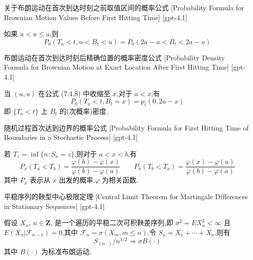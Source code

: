 \documentclass[UTF8]{ctexart}
\begin{document}
    
    
    \begin{thm}
        {关于布朗运动在首次到达时刻之前取值区间的概率公式}
        [Probability Formula for Brownian Motion Values Before First Hitting Time]
        [gpt-4.1]
        
如果 $u < 
u \leq a$,则
\[
P_{0}( T_{a} < t, u < B_{t} < 
u ) = P_{0}( 2a - 
u < B_{t} < 2a - u )
\]

    \end{thm}
    
    
    
    \begin{thm}
        {布朗运动在首次到达时刻后精确位置的概率密度公式}
        [Probability Density Formula for Brownian Motion at Exact Location After First Hitting Time]
        [gpt-4.1]
        
当 $(u, 
u)$ 在公式 (7.4.8) 中收缩至 $x$,对于 $a < x$,有
\[
P_{0}( T_{a} < t, B_{t} = x ) = p_{t}( 0, 2a - x )
\]
即 $\{ T_{a} < t \}$ 上 $B_{t}$ 的(次概率)密度.

    \end{thm}
    
    
    
    \begin{thm}
        {随机过程首次达到边界的概率公式}
        [Probability Formula for First Hitting Time of Boundaries in a Stochastic Process]
        [gpt-4.1]
        
若 $T_{z} = \operatorname*{inf} \{ n : S_{n} = z \}$,则对于 $a < x < b$,有
\[
P_{x}( T_{a} < T_{b} ) = \frac{ \varphi(b) - \varphi(x) }{ \varphi(b) - \varphi(a) } \qquad P_{x}( T_{b} < T_{a} ) = \frac{ \varphi(x) - \varphi(a) }{ \varphi(b) - \varphi(a) }
\]
其中 $P_{x}$ 表示从 $x$ 出发的概率,$\varphi$ 为相关函数.

    \end{thm}
    
    
    
    \begin{thm}
        {平稳序列的鞅型中心极限定理}
        [Central Limit Theorem for Martingale Differences in Stationary Sequences]
        [gpt-4.1]
        
假设 $X_{n}$, $n \in \mathbf{Z}$, 是一个遍历的平稳二次可积鞅差序列,即 $\sigma^{2} = E X_{n}^{2} < \infty$ 且 $E( X_{n} | \mathcal{F}_{n-1} ) = 0$,其中 $\mathcal{F}_{n} = \sigma ( X_{m}, m \leq n )$.令 $S_{n} = X_{1} + \cdots + X_{n}$.则有
\[
S_{(n \cdot)}/n^{1/2} \Rightarrow \sigma B(\cdot)
\]
其中 $B(\cdot)$ 为标准布朗运动.

    \end{thm}
    
\end{document}
